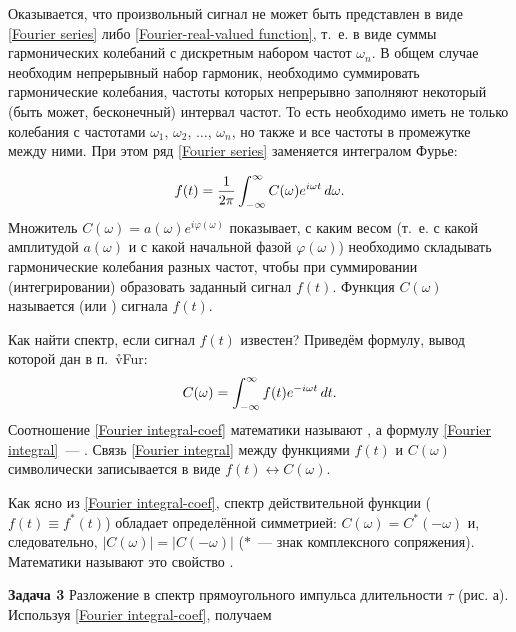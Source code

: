 Оказывается, что произвольный сигнал не может быть представлен в виде \eqref{Fourier series} либо \eqref{Fourier-real-valued function}, т.~е. в виде суммы
гармонических колебаний с дискретным набором частот $\omega_n$. В общем случае необходим непрерывный набор гармоник,
необходимо суммировать гармонические колебания, частоты которых непрерывно заполняют некоторый (быть может, бесконечный)
интервал частот. То есть необходимо иметь не только колебания с частотами $\omega_1$, $\omega_2$, $\dots$, $\omega_n$,
но также и все частоты в промежутке между ними. При этом ряд \eqref{Fourier series} заменяется интегралом Фурье:

\begin{equation}
	\eqmark{Fourier integral}
	f(t)=\frac{1}{2\pi}\int_{-\infty}^\infty C(\omega)e^{i\omega t}\,d\omega.
\end{equation}
Множитель $C(\omega)=a(\omega)e^{i\varphi(\omega)}$ показывает, с каким весом (т.~е. с какой амплитудой $a(\omega)$ и с
какой начальной фазой $\varphi(\omega)$) необходимо складывать гармонические колебания разных частот, чтобы при суммировании
(интегрировании) образовать заданный сигнал $f(t)$. Функция $C(\omega)$ называется  (или
) сигнала $f(t)$.

Как найти спектр, если сигнал $f(t)$ известен? Приведём формулу, вывод которой дан в п.~\r{vFur}:
\begin{equation}
	\eqmark{Fourier integral-coef}
	C(\omega)=\int_{-\infty}^\infty f(t)e^{-i\omega t}\,dt.
\end{equation}
Соотношение \eqref{Fourier integral-coef} математики называют , а формулу \eqref{Fourier integral}~--- . Связь \eqref{Fourier integral} между функциями $f(t)$ и $C(\omega)$ символически записывается в виде
$f(t)\leftrightarrow C(\omega)$.

Как ясно из \eqref{Fourier integral-coef}, спектр действительной функции ($f(t)\equiv f^*(t)$) обладает определённой симметрией:
$C(\omega)=C^*(-\omega)$ и, следовательно, $|C(\omega)|=|C(-\omega)|$ ($*$~--- знак комплексного сопряжения). Математики называют это
свойство .

\textbf{Задача 3} Разложение в спектр прямоугольного импульса длительности $\tau$ (рис. а). Используя \eqref{Fourier integral-coef}, получаем

